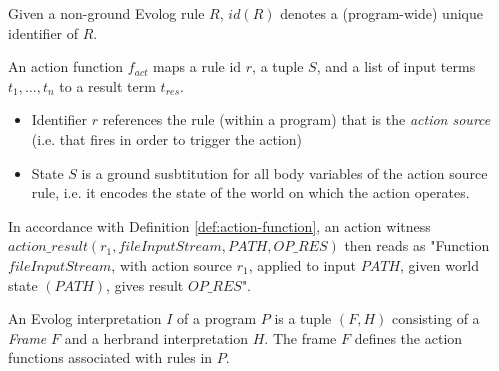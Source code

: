 \begin{definition}
\label{def:rule-id}
Given a non-ground Evolog rule $R$, $id(R)$ denotes a (program-wide) unique identifier of $R$.
\end{definition}

\begin{definition}
\label{def:action-function}
An action function $f_{act}$ maps a rule id $r$, a tuple $S$, and a list of input terms $t_1,\ldots, t_n$ to a result term $t_{res}$.
\begin{itemize}
	\item Identifier $r$ references the rule (within a program) that is the \emph{action source} (i.e. that fires in order to trigger the action)
	\item State $S$ is a ground susbtitution for all body variables of the action source rule, i.e. it encodes the state of the world on which the action operates.
\end{itemize}
\end{definition}
In accordance with Definition \ref{def:action-function}, an action witness $action\_result(r_1, fileInputStream, PATH, OP\_RES)$ then reads as "Function $fileInputStream$, with action source $r_1$, applied to input $PATH$, given world state $(PATH)$, gives result $OP\_RES$". 

\begin{definition}
\label{def:evolog-interpretation}
An Evolog interpretation $I$ of a program $P$ is a tuple $(F, H)$ consisting of a \emph{Frame} $F$ and a herbrand interpretation $H$. The frame $F$ defines the action functions associated with rules in $P$.
\end{definition}